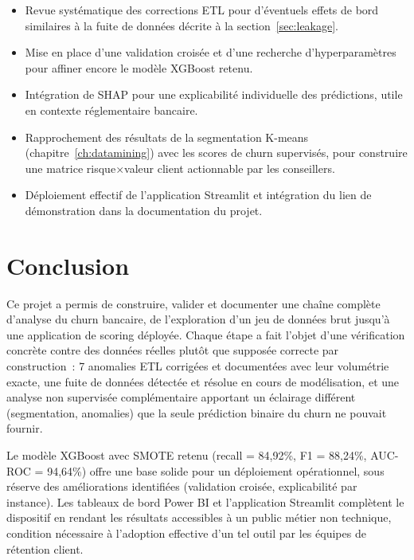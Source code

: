 \documentclass[11pt,a4paper]{report}
\begin{document}
\begin{itemize}
\item Revue syst\'ematique des corrections ETL pour d'\'eventuels effets de
      bord similaires \`a la fuite de donn\'ees d\'ecrite \`a la
      section~\ref{sec:leakage}.
\item Mise en place d'une validation crois\'ee et d'une recherche
      d'hyperparam\`etres pour affiner encore le mod\`ele XGBoost retenu.
\item Int\'egration de SHAP pour une explicabilit\'e individuelle des
      pr\'edictions, utile en contexte r\'eglementaire bancaire.
\item Rapprochement des r\'esultats de la segmentation K-means
      (chapitre~\ref{ch:datamining}) avec les scores de churn supervis\'es,
      pour construire une matrice risque$\times$valeur client actionnable par
      les conseillers.
\item D\'eploiement effectif de l'application Streamlit et int\'egration du
      lien de d\'emonstration dans la documentation du projet.
\end{itemize}

\chapter{Conclusion}
\label{ch:conclusion}

Ce projet a permis de construire, valider et documenter une cha\^ine compl\`ete
d'analyse du churn bancaire, de l'exploration d'un jeu de donn\'ees brut
jusqu'\`a une application de scoring d\'eploy\'ee. Chaque \'etape a fait l'objet
d'une v\'erification concr\`ete contre des donn\'ees r\'eelles plut\^ot que
suppos\'ee correcte par construction~: 7 anomalies ETL corrig\'ees et
document\'ees avec leur volum\'etrie exacte, une fuite de donn\'ees d\'etect\'ee et
r\'esolue en cours de mod\'elisation, et une analyse non supervis\'ee compl\'ementaire
apportant un \'eclairage diff\'erent (segmentation, anomalies) que la seule
pr\'ediction binaire du churn ne pouvait fournir.

Le mod\`ele XGBoost avec SMOTE retenu (recall = 84,92\%, F1 = 88,24\%,
AUC-ROC = 94,64\%) offre une base solide pour un d\'eploiement op\'erationnel,
sous r\'eserve des am\'eliorations identifi\'ees (validation crois\'ee,
explicabilit\'e par instance). Les tableaux de bord Power BI et l'application
Streamlit compl\`etent le dispositif en rendant les r\'esultats accessibles \`a
un public m\'etier non technique, condition n\'ecessaire \`a l'adoption effective
d'un tel outil par les \'equipes de r\'etention client.
\end{document}
